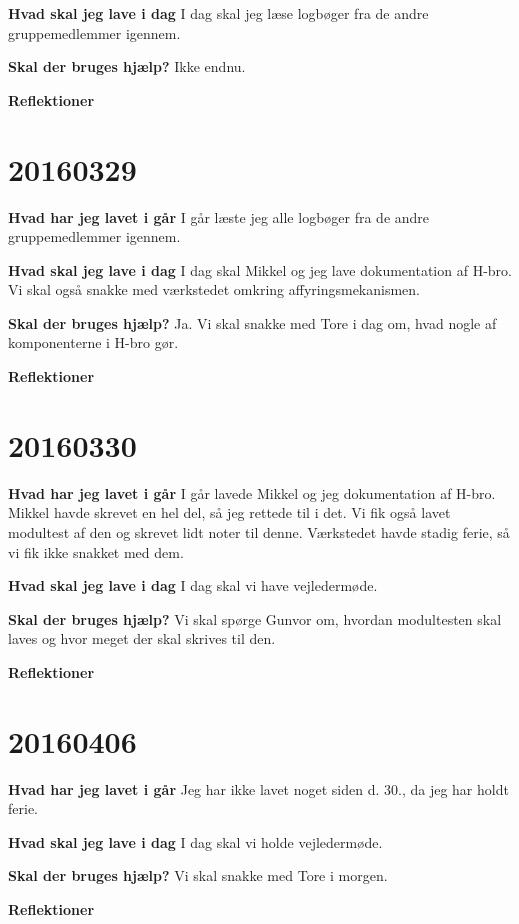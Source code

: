 \documentclass{article}
\begin{document}
	\textbf{Hvad skal jeg lave i dag}
	I dag skal jeg læse logbøger fra de andre gruppemedlemmer igennem. 
	
	\textbf{Skal der bruges hjælp?}
	Ikke endnu. 
	
	\textbf{Reflektioner}
	
	\section{20160329}
	
	\textbf{Hvad har jeg lavet i går}
	I går læste jeg alle logbøger fra de andre gruppemedlemmer igennem. 
		
	\textbf{Hvad skal jeg lave i dag}
	I dag skal Mikkel og jeg lave dokumentation af H-bro. Vi skal også snakke med værkstedet omkring affyringsmekanismen. 
	
	\textbf{Skal der bruges hjælp?}
	Ja. Vi skal snakke med Tore i dag om, hvad nogle af komponenterne i H-bro gør. 
	
	\textbf{Reflektioner}

	\section{20160330}
	
	\textbf{Hvad har jeg lavet i går}
	I går lavede Mikkel og jeg dokumentation af H-bro. Mikkel havde skrevet en hel del, så jeg rettede til i det. Vi fik også lavet modultest af den og skrevet lidt noter til denne. Værkstedet havde stadig ferie, så vi fik ikke snakket med dem. 

	\textbf{Hvad skal jeg lave i dag}
	I dag skal vi have vejledermøde. 
	
	\textbf{Skal der bruges hjælp?}
	Vi skal spørge Gunvor om, hvordan modultesten skal laves og hvor meget der skal skrives til den. 
	
	\textbf{Reflektioner}

	\section{20160406}
	
	\textbf{Hvad har jeg lavet i går}
	Jeg har ikke lavet noget siden d. 30., da jeg har holdt ferie. 
	
	\textbf{Hvad skal jeg lave i dag}
	I dag skal vi holde vejledermøde. 
	
	\textbf{Skal der bruges hjælp?}
	Vi skal snakke med Tore i morgen. 
	
	\textbf{Reflektioner}
	
\end{document}
